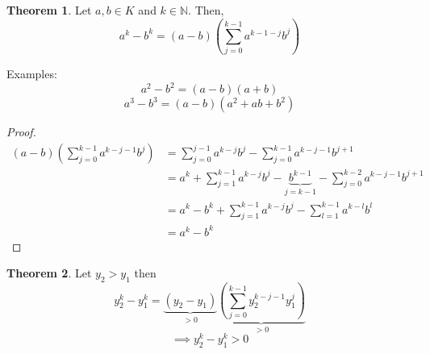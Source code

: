\documentclass[a4paper,landscape,twocolumn]{article}
\theoremstyle{definition}
\newtheorem{theorem}{Theorem}
\begin{document}
\begin{theorem}
  Let $a, b \in K$ and $k \in \mathbb N$.
  Then,
  \[ a^k - b^k = (a - b)\left(\sum_{j=0}^{k-1} a^{k-1-j} b^j\right) \]
\end{theorem}

Examples:
  \[ a^2 - b^2 = (a - b)(a + b) \]
  \[ a^3 - b^3 = (a - b)(a^2 + ab + b^2) \]

\begin{proof}
  \begin{align*}
    (a - b)\left(\sum_{j=0}^{k-1} a^{k-j-1} b^j\right)
      &= \sum_{j=0}^{j-1} a^{k-j} b^j - \sum_{j=0}^{k-1} a^{k-j-1} b^{j+1} \\
      &= a^k + \sum_{j=1}^{k-1} a^{k-j} b^j - \underbrace{b^{k-1}}_{j=k-1} - \sum_{j=0}^{k-2} a^{k-j-1} b^{j+1} \\
      &= a^k - b^k + \sum_{j=1}^{k-1} a^{k-j} b^j - \sum_{l=1}^{k-1} a^{k-l} b^l \\
      &= a^k - b^k
  \end{align*}
\end{proof}

\begin{theorem}
  Let $y_2 > y_1$ then
  \[ y_2^k - y_1^k = \underbrace{(y_2 - y_1)}_{> 0} \underbrace{\left(\sum_{j=0}^{k-1} y_2^{k-j-1} y_1^j\right)}_{> 0} \]
  \[ \implies y_2^k - y_1^k > 0 \]
\end{theorem}
\end{document}
